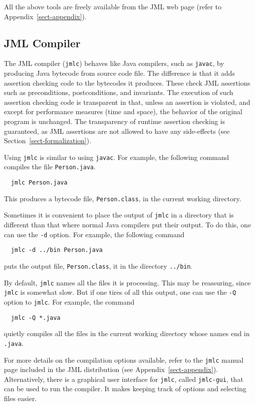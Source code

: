 \documentclass{jotarticle}
\begin{document}
All the above tools are freely available from the JML web page (refer
to Appendix~\ref{sect-appendix}). 

\subsection{JML Compiler}
\label{sect-jml-compiler}

The JML compiler (\texttt{jmlc}) behaves like Java compilers, such as
\texttt{javac}, by producing Java bytecode from source code file.  The
difference is that it adds assertion checking code to the bytecodes it
produces.  These check JML assertions such as preconditions,
postconditions, and invariants.
The execution of such assertion checking code is
transparent in that, unless an assertion is violated, and except for
performance measures (time and space), the behavior of the original
program is unchanged.  The transparency of runtime assertion checking
is guaranteed, as JML assertions are not allowed to have any
side-effects (see Section~\ref{sect-formalization}).

Using \texttt{jmlc} is similar to using \texttt{javac}.
For example, the following command compiles the file \texttt{Person.java}.
\begin{verbatim}
  jmlc Person.java
\end{verbatim}
This produces a bytecode file, \texttt{Person.class},
in the current working directory.

Sometimes it is convenient to place the output of \texttt{jmlc} in a
directory that is different than that where normal Java compilers put
their output.  To do this, one can use the \texttt{-d} option.
For example, the following command
\begin{verbatim}
  jmlc -d ../bin Person.java
\end{verbatim}
puts the output file, \texttt{Person.class}, it in the directory
\texttt{../bin}. 

By default, \texttt{jmlc} names all the files it is processing.  This
may be reassuring, since \texttt{jmlc} is somewhat slow.  But if one
tires of all this output, one can use the \texttt{-Q} option to
\texttt{jmlc}.  For example, the command
\begin{verbatim}
  jmlc -Q *.java
\end{verbatim}
quietly compiles all the files in the current working directory
whose names end in \texttt{.java}.

For more details on the compilation options available, refer to the
\texttt{jmlc} manual page included in the JML distribution (see
Appendix~\ref{sect-appendix}).
Alternatively, there is a graphical user interface for \texttt{jmlc},
called \texttt{jmlc-gui}, that can be used to run the compiler.  It
makes keeping track of options and selecting files easier.
\end{document}
